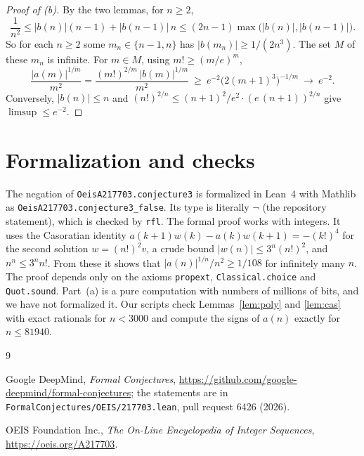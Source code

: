\documentclass[11pt]{amsart}
\theoremstyle{remark}
\newcommand{\lean}[1]{\texttt{#1}}
\begin{document}
\begin{proof}[Proof of (b)]
By the two lemmas, for $n\ge2$,
\[
\frac1{n^2}\le|b(n)|(n-1)+|b(n-1)|\,n\le(2n-1)\max\bigl(|b(n)|,|b(n-1)|\bigr).
\]
So for each $n\ge2$ some $m_n\in\{n-1,n\}$ has $|b(m_n)|\ge1/(2n^3)$.
The set $M$ of these $m_n$ is infinite.
For $m\in M$, using $m!\ge(m/e)^m$,
\[
\frac{|a(m)|^{1/m}}{m^2}=\frac{(m!)^{2/m}\,|b(m)|^{1/m}}{m^2}\ \ge\ e^{-2}\bigl(2(m+1)^3\bigr)^{-1/m}\ \longrightarrow\ e^{-2}.
\]
Conversely, $|b(n)|\le n$ and $(n!)^{2/n}\le(n+1)^2/e^{2}\cdot(e\,(n+1))^{2/n}$ give $\limsup\le e^{-2}$.
\end{proof}

\section{Formalization and checks}

The negation of \lean{OeisA217703.conjecture3} is formalized in Lean~4 with Mathlib as \lean{OeisA217703.conjecture3\_false}.
Its type is literally $\neg$ (the repository statement), which is checked by \lean{rfl}.
The formal proof works with integers.
It uses the Casoratian identity $a(k+1)w(k)-a(k)w(k+1)=-(k!)^4$ for the second solution $w=(n!)^2v$, a crude bound $|w(n)|\le3^n(n!)^2$, and $n^n\le3^nn!$.
From these it shows that $|a(n)|^{1/n}/n^2\ge1/108$ for infinitely many $n$.
The proof depends only on the axioms \lean{propext}, \lean{Classical.choice} and \lean{Quot.sound}.
Part~(a) is a pure computation with numbers of millions of bits, and we have not formalized it.
Our scripts check Lemmas~\ref{lem:poly} and \ref{lem:cas} with exact rationals for $n<3000$ and compute the signs of $a(n)$ exactly for $n\le81940$.

\begin{thebibliography}{9}

Google DeepMind, \emph{Formal Conjectures}, \url{https://github.com/google-deepmind/formal-conjectures}; the statements are in \texttt{FormalConjectures/OEIS/217703.lean}, pull request 6426 (2026).

OEIS Foundation Inc., \emph{The On-Line Encyclopedia of Integer Sequences}, \url{https://oeis.org/A217703}.

\end{thebibliography}
\end{document}
